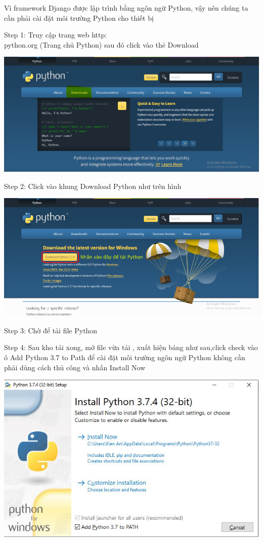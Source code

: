 \documentclass{article}
\begin{document}
\fontsize{13}{20}\selectfont

Vì framework Django được lập trình bằng ngôn ngữ Python, vậy nên chúng ta cần phải cài đặt môi trường Python cho thiết bị

Step 1: Truy cập trang web http:\\python.org (Trang chủ Python) sau đó click vào thẻ Download 

        \includegraphics{5.jpg}
\pagebreak

Step 2: Click vào khung Download Python như trên hình

\includegraphics[sacle=0.4]{6.jpg}
	
Step 3: Chờ để tải file Python

Step 4: Sau kho tải xong, mở file vừa tải , xuất hiện bảng như sau,click check vào ô Add Python 3.7 to Path để cài đặt môi trường ngôn ngữ Python không cần phải dùng cách thủ công và nhấn Install Now

\includegraphics{7.jpg}
\end{document}
